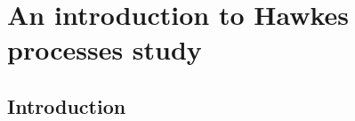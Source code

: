 \leadchapter{
  
}

\chapter[][]{An introduction to Hawkes processes study}\label{chapter:background}

\section{Introduction}
